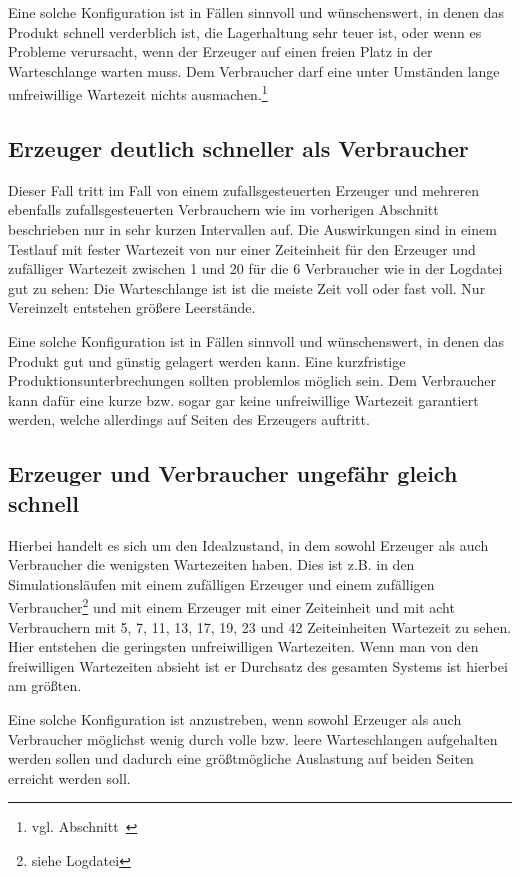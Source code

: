 Eine solche Konfiguration ist in Fällen sinnvoll und wünschenswert, in denen das Produkt schnell verderblich ist, die Lagerhaltung sehr teuer ist, oder wenn es Probleme verursacht, wenn der Erzeuger auf einen freien Platz in der Warteschlange warten muss. Dem Verbraucher darf eine unter Umständen lange unfreiwillige Wartezeit nichts ausmachen.\footnote{vgl. Abschnitt~}


\subsection{Erzeuger deutlich schneller als Verbraucher} %
\label{sub:erzeuger_schneller_als_verbraucher}
Dieser Fall tritt im Fall von einem zufallsgesteuerten Erzeuger und mehreren ebenfalls zufallsgesteuerten Verbrauchern wie im vorherigen Abschnitt beschrieben nur in sehr kurzen Intervallen auf. Die Auswirkungen sind in einem Testlauf mit fester Wartezeit von nur einer Zeiteinheit für den Erzeuger und zufälliger Wartezeit zwischen 1 und 20 für die 6 Verbraucher wie in der Logdatei  gut zu sehen: Die Warteschlange ist ist die meiste Zeit voll oder fast voll. Nur Vereinzelt entstehen größere Leerstände. 

Eine solche Konfiguration ist in Fällen sinnvoll und wünschenswert, in denen das Produkt gut und günstig gelagert werden kann. Eine kurzfristige Produktionsunterbrechungen sollten problemlos möglich sein. Dem Verbraucher kann dafür eine kurze bzw. sogar gar keine unfreiwillige Wartezeit garantiert werden, welche allerdings auf Seiten des Erzeugers auftritt.

\subsection{Erzeuger und Verbraucher ungefähr gleich schnell} %
\label{sub:erzeuger_und_verbraucher_gleich_schnell}
Hierbei handelt es sich um den Idealzustand, in dem sowohl Erzeuger als auch Verbraucher die wenigsten Wartezeiten haben. Dies ist z.B. in den Simulationsläufen mit einem zufälligen Erzeuger und einem zufälligen Verbraucher\footnote{siehe Logdatei } und mit einem Erzeuger mit einer Zeiteinheit und mit acht Verbrauchern mit 5, 7, 11, 13, 17, 19, 23 und 42 Zeiteinheiten Wartezeit zu sehen. Hier entstehen die geringsten unfreiwilligen Wartezeiten. Wenn man von den freiwilligen Wartezeiten absieht ist er Durchsatz des gesamten Systems ist hierbei am größten.

Eine solche Konfiguration ist anzustreben, wenn sowohl Erzeuger als auch Verbraucher möglichst wenig durch volle bzw. leere Warteschlangen aufgehalten werden sollen und dadurch eine größtmögliche Auslastung auf beiden Seiten erreicht werden soll.


